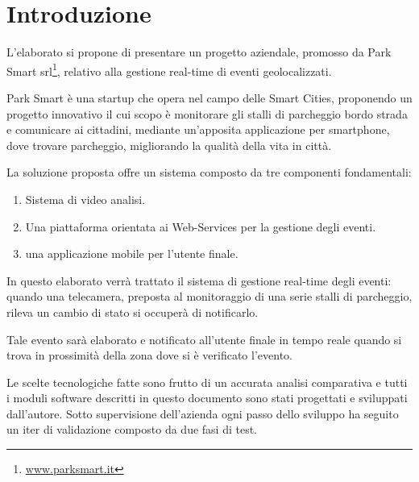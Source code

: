 \chapter{Introduzione}
L'elaborato si propone di presentare un progetto aziendale, promosso da Park Smart srl\footnote{\href{http://www.parksmart.it}{www.parksmart.it}}, relativo alla gestione real-time di eventi geolocalizzati. 

Park Smart è una startup che opera nel campo delle Smart Cities, proponendo un progetto innovativo il cui scopo è monitorare gli stalli di parcheggio bordo strada e comunicare ai cittadini, mediante un'apposita applicazione per smartphone, dove trovare parcheggio, migliorando la qualità della vita in città.

La soluzione proposta offre un sistema composto da tre componenti fondamentali:

\begin{enumerate}
\item Sistema di video analisi.
\item Una piattaforma orientata ai Web-Services per 
la gestione degli eventi.
\item una applicazione mobile per l'utente finale.
\end{enumerate}


In questo elaborato verrà trattato il sistema di gestione real-time degli eventi: quando una telecamera, preposta al monitoraggio di una serie stalli di parcheggio, rileva un cambio di stato si occuper\`a di notificarlo. 

Tale evento sarà elaborato e notificato all'utente finale in tempo reale quando si trova in prossimit\`a della zona dove si è verificato l'evento. 

Le scelte tecnologiche fatte sono frutto di un accurata analisi comparativa e tutti i moduli software descritti in questo documento sono stati progettati e sviluppati dall'autore. Sotto supervisione dell'azienda ogni passo dello sviluppo ha seguito un iter di validazione composto da due fasi di test.
